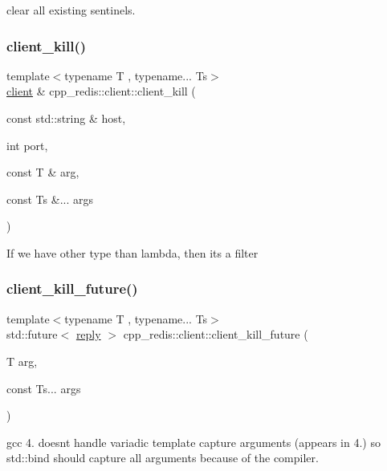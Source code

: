 clear all existing sentinels. \mbox{\label{classcpp__redis_1_1client_ae4090830d1710276c33ff5a74eba2e4b}} 
\subsubsection{\texorpdfstring{client\+\_\+kill()}{client\_kill()}}
{\footnotesize\ttfamily template$<$typename T , typename... Ts$>$ \\
\mbox{\hyperlink{classcpp__redis_1_1client}{client}} \& cpp\+\_\+redis\+::client\+::client\+\_\+kill (\begin{DoxyParamCaption}\item[{const std\+::string \&}]{host,  }\item[{int}]{port,  }\item[{const T \&}]{arg,  }\item[{const Ts \&...}]{args }\end{DoxyParamCaption})\hspace{0.3cm}{\ttfamily [inline]}}

If we have other type than lambda, then it\textquotesingle{}s a filter \mbox{\label{classcpp__redis_1_1client_aa3e8686d5c21bd654a6c67179d988d5e}} 
\subsubsection{\texorpdfstring{client\+\_\+kill\+\_\+future()}{client\_kill\_future()}}
{\footnotesize\ttfamily template$<$typename T , typename... Ts$>$ \\
std\+::future$<$ \mbox{\hyperlink{classcpp__redis_1_1reply}{reply}} $>$ cpp\+\_\+redis\+::client\+::client\+\_\+kill\+\_\+future (\begin{DoxyParamCaption}\item[{T}]{arg,  }\item[{const Ts...}]{args }\end{DoxyParamCaption})}

gcc 4. doesn\textquotesingle{}t handle variadic template capture arguments (appears in 4.) so std\+::bind should capture all arguments because of the compiler. \mbox{\label{classcpp__redis_1_1client_a18e123faf9400013ad2f1063e5824dc0}} 
